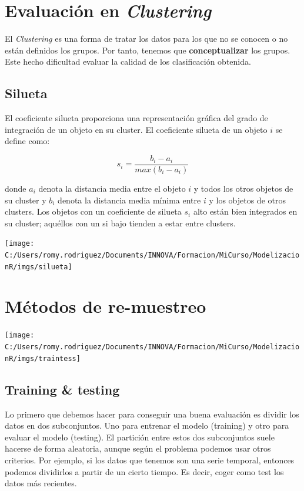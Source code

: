 \documentclass[]{book}
\begin{document}
\hypertarget{evaluacion-en-clustering}{%
\section{\texorpdfstring{Evaluación en \emph{Clustering}}{Evaluación en Clustering}}\label{evaluacion-en-clustering}}

El \emph{Clustering} es una forma de tratar los datos para los que no se conocen o no están definidos los grupos. Por tanto, tenemos que \textbf{conceptualizar} los grupos. Este hecho dificultad evaluar la calidad de los clasificación obtenida.

\hypertarget{silueta}{%
\subsection{Silueta}\label{silueta}}

El coeficiente silueta proporciona una representación gráfica del grado de integración de un objeto en su cluster. El coeficiente silueta de un objeto \(i\) se define como:

\[s_i=\dfrac{b_i -a_i}{max(b_i -a_i)}\]

donde \(a_i\) denota la distancia media entre el objeto \(i\) y todos los otros objetos de su cluster y \(b_i\) denota la distancia media mínima entre \(i\) y los objetos de otros clusters.
Los objetos con un coeficiente de silueta \(s_i\) alto están bien integrados en su cluster; aquéllos con un si bajo tienden a estar entre clusters.

\texttt{[image: C:/Users/romy.rodriguez/Documents/INNOVA/Formacion/MiCurso/ModelizacionR/imgs/silueta]}

\hypertarget{metodos-de-re-muestreo}{%
\section{Métodos de re-muestreo}\label{metodos-de-re-muestreo}}

\texttt{[image: C:/Users/romy.rodriguez/Documents/INNOVA/Formacion/MiCurso/ModelizacionR/imgs/traintess]}

\hypertarget{training-testing}{%
\subsection{Training \& testing}\label{training-testing}}

Lo primero que debemos hacer para conseguir una buena evaluación es dividir los datos en dos subconjuntos. Uno para entrenar el modelo (training) y otro para evaluar el modelo (testing). El partición entre estos dos subconjuntos suele hacerse de forma aleatoria, aunque según el problema podemos usar otros criterios. Por ejemplo, si los datos que tenemos son una serie temporal, entonces podemos dividirlos a partir de un cierto tiempo. Es decir, coger como test los datos más recientes.
\end{document}
